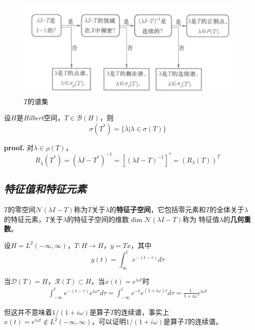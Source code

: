\begin{figure}[H]
    \centering
    \includegraphics[scale=0.6]{figures/WX20240905-110243@2x.png}
    \caption{$T$的谱集}
\end{figure}

\begin{mdframed}
    \begin{theorem}
        设$H$是\textsl{Hilbert}空间，$T\in \mathcal{B}(H)$，则
        \begin{equation}
            \sigma(T^*)=\{\overline{\lambda}|\lambda\in \sigma(T)\}
        \end{equation}
    \end{theorem}
\end{mdframed}

\textbf{proof.}\hspace*{0.5em} 对$\lambda \in \rho(T)$，
\begin{equation}
    R_{\overline{\lambda}}(T^*)=(\overline{\lambda}I-T^*)^{-1}=[(\lambda I-T)^{-1}]^*=(R_\lambda(T))^T
\end{equation}

\subsection*{\textsl{特征值和特征元素}}

$T$的零空间$\mathcal{N}(\lambda I-T)$称为$T$关于$\lambda$的\textbf{特征子空间}，它包括零元素和$T$的全体关于$\lambda$的特征元素，$T$关于$\lambda$的特征子空间的维数$\dim\mathcal{N}(\lambda I-T)$称为
特征值$\lambda$的\textbf{几何重数}。

\begin{example}
    设$H=L^2(-\infty,\infty)$，$T:H\rightarrow H$，$y=Tx$，其中
    \begin{equation}
        y(t)=\int_{\infty}^{t}e^{-(t-\tau)}d\tau
    \end{equation}

  当$\mathcal{D}(T)=H$，$\mathcal{R}(T)\subset H$，当$x(t)=e^{i\omega t}$时
    \begin{eqnarray}
        \int_{-\infty}^{t}e^{-(t-\tau)}e^{i\omega \tau}d\tau=\int_{-\infty}^{t}e^{-t}e^{(1+i\omega)\tau}d\tau=\frac{1}{1+i\omega}e^{i\omega t}
    \end{eqnarray}

    但这并不意味着$1/(1+i \omega)$是算子$T$的连续谱，事实上$x(t)= e^{i\omega t}\notin L^2(-\infty, \infty)$，可以证明$1/(1+i\omega)$是算子$T$的连续谱。
\end{example}


